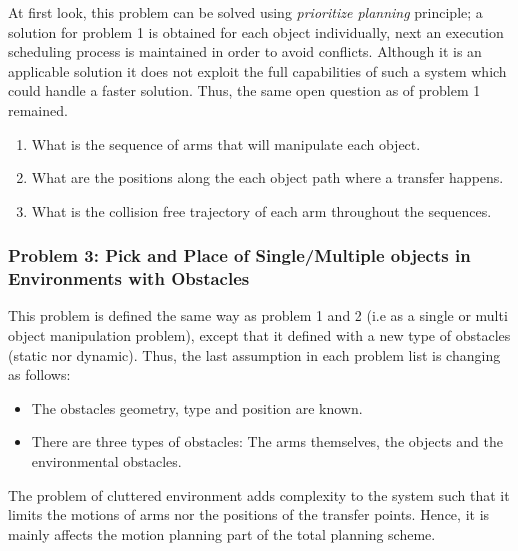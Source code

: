 
At first look, this problem can be solved using \textit{prioritize planning} principle; a solution for problem 1 is obtained for each object individually, next an execution scheduling process is maintained in order to avoid conflicts. Although it is an applicable solution it does not exploit the full capabilities of such a system which could handle a faster solution. Thus, the same open question as of problem 1 remained.

\begin{enumerate}
\item What is the sequence of arms that will manipulate each object.
\item What are the positions along the each object path where a transfer happens.
\item  What is the collision free trajectory of each arm throughout the sequences.
\end{enumerate}
  
\subsubsection*{Problem 3: Pick and Place of Single/Multiple objects in Environments with Obstacles}
This problem is defined the same way as problem 1 and 2 (i.e as a single or multi object manipulation problem), except that it defined with a new type of obstacles (static nor dynamic). Thus, the last assumption in each problem list is changing as follows:
\begin{itemize}
\item The obstacles geometry, type and position are known.
\item There are three types of obstacles: The arms themselves, the objects and the environmental obstacles.
\end{itemize} 
The problem of cluttered environment adds complexity to the system such that it limits the motions of arms nor the positions of the transfer points. Hence, it is mainly affects the motion planning part of the total planning scheme. 

